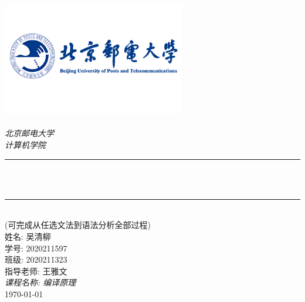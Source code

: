 \begin{titlepage}
	\newcommand{\HRule}{\rule{\linewidth}{0.5mm}}
	\includegraphics[width=8cm]{title/logo_bupt.png}\\[1cm]
	\center
	\quad\\[1.5cm]
	\textsl{\Large 北京邮电大学}\\[0.5cm]
	\textsl{\large  计算机学院}\\[0.5cm]
	\makeatletter
	\HRule \\[0.4cm]
	{\huge \bfseries \@title}\\[0.4cm]
	\HRule \\[1.5cm]
	\large {(可完成从任选文法到语法分析全部过程)}\\[2cm]
	\makeatother
	{\large 姓名: 吴清柳}\\[0.5cm]
	{\large 学号: 2020211597}\\[0.5cm]
	{\large 班级: 2020211323}\\[0.5cm]
	{\large 指导老师: 王雅文}\\[0.5cm]
	{\large \emph{课程名称: 编译原理}}\\[0.5cm]
	{\large \today}\\[2cm]
	\vfill
\end{titlepage}
